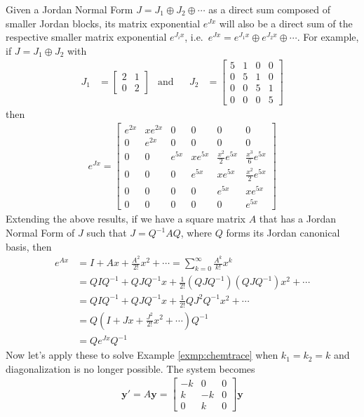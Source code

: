 Given a Jordan Normal Form $J = J_1 \oplus J_2 \oplus \cdots$ as a direct sum composed of smaller Jordan blocks, its matrix exponential $e^{Jx}$ will also be a direct sum of the respective smaller matrix exponential $e^{J_ix}$, i.e.\ $e^{Jx} = e^{J_1x} \oplus e^{J_2x} \oplus \cdots$. For example, if $J = J_1 \oplus J_2$ with
\begin{align*}
J_1 &= \begin{bmatrix}
2 & 1 \\
0 & 2
\end{bmatrix}
& \text{and} & & J_2 &=
\begin{bmatrix}
5 & 1 & 0 & 0 \\
0 & 5 & 1 & 0 \\
0 & 0 & 5 & 1 \\
0 & 0 & 0 & 5
\end{bmatrix}
\end{align*}
then
\begin{align*}
e^{Jx} =
\begin{bmatrix}
e^{2x} & xe^{2x} & 0 & 0 & 0 & 0 \\
0 & e^{2x} & 0 & 0 & 0 & 0 \\
0 & 0 & e^{5x} & xe^{5x} & \frac{x^2}{2}e^{5x} & \frac{x^3}{6}e^{5x} \\
0 & 0 & 0 & e^{5x} & xe^{5x} & \frac{x^2}{2}e^{5x} \\
0 & 0 & 0 & 0 & e^{5x} & xe^{5x} \\
0 & 0 & 0 & 0 & 0 & e^{5x} 
\end{bmatrix}
\end{align*}
Extending the above results, if we have a square matrix $A$ that has a Jordan Normal Form of $J$ such that $J = Q^{-1}AQ$, where $Q$ forms its Jordan canonical basis, then
\begin{align}
e^{Ax} &= I + Ax + \frac{A^2}{2!}x^2 + \cdots = \sum_{k=0}^{\infty} \frac{A^k}{k!}x^k  \nonumber \\
&= QIQ^{-1} + QJQ^{-1}x + \frac{1}{2!}(QJQ^{-1})(QJQ^{-1})x^2 + \cdots \nonumber \\
&= QIQ^{-1} + QJQ^{-1}x + \frac{1}{2!}QJ^2Q^{-1}x^2 + \cdots \nonumber \\
&= Q(I + Jx + \frac{J^2}{2!}x^2 + \cdots)Q^{-1} \nonumber \\
&= Qe^{Jx}Q^{-1}
\end{align}
Now let's apply these to solve Example \ref{exmp:chemtrace} when $k_1 = k_2 = k$ and diagonalization is no longer possible. The system becomes
\begin{align*}
\textbf{y}'
= A\textbf{y} =
\begin{bmatrix}
-k & 0 & 0 \\
k & -k & 0 \\
0 & k & 0 
\end{bmatrix}
\textbf{y}
\end{align*}
